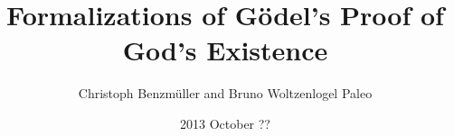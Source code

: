 \documentclass[9pt]{beamer}
\title[Formalizations of G\"{o}del's Proof of God's Existence]{Formalizations of G\"{o}del's Proof of God's Existence}
\author{Christoph Benzm\"{u}ller and Bruno Woltzenlogel Paleo}
\institute[] {
  \inst{}%
}
\date[29.10.13]
{2013 October ??}
\begin{document}
\begin{frame}
  \titlepage
\end{frame}
\end{document}
